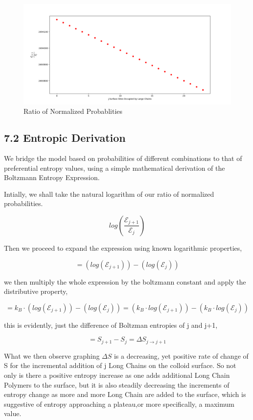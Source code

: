 \documentclass[journal=jacsat,manuscript=article]{achemso}
\begin{document}
\begin{figure}[H]
\includegraphics[scale=0.70]{fig11.png}
\caption{Ratio of Normalized Probablities}
\label{figure 11}
\end{figure}


\subsection{7.2 Entropic Derivation}

We bridge the model based on probabilities of different combinations to that of preferential entropy values, using a simple mathematical derivation of the Boltzmann Entropy Expression.

\noindent Intially, we shall take the natural logarithm of our ratio of normalized probabilities.

$$log\left(\frac{\mathcal{E}_{j+1}}{\mathcal{E}_{j}}\right)$$

\noindent Then we proceed to expand the expression using known logarithmic properties,

$$=\left(log\left(\mathcal{E}_{j+1}\right)\right)-\left(log\left(\mathcal{E}_{j}\right)\right)$$


\noindent we then multiply the whole expression by the boltzmann constant and apply the distributive property,

$$=k_B\cdot\left(log\left(\mathcal{E}_{j+1}\right)\right)-\left(log\left(\mathcal{E}_{j}\right)\right)= \left(k_B\cdot log\left(\mathcal{E}_{j+1}\right)\right)-\left(k_B\cdot log\left(\mathcal{E}_{j}\right)\right)$$

\noindent this is evidently, just the difference of Boltzman entropies of j and j+1,

$$=S_{j+1}-S_{j}=\Delta S_{j\to j+1}$$

What we then observe graphing $\Delta S$ is a decreasing, yet positive rate of change of S for the incremental addition of j Long Chains on the colloid surface. So not only is there a positive entropy increase as one adds additional Long Chain Polymers to the surface, but it is also steadily decreasing the increments of entropy change as more and more Long Chain are added to the surface, which is suggestive of entropy approaching a plateau,or more specifically, a maximum value. 
\end{document}
